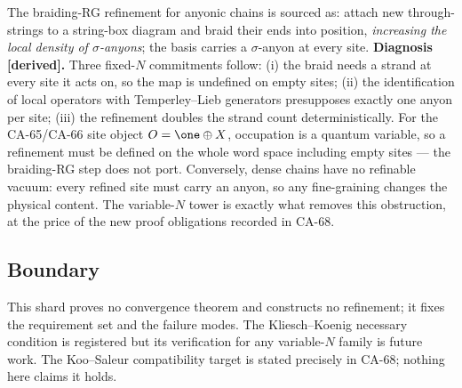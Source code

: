 The braiding-RG refinement for anyonic chains is sourced as: attach new
through-strings to a string-box diagram and braid their ends into position,
\emph{increasing the local density of \(\sigma\)-anyons}; the basis carries a
\(\sigma\)-anyon at every site.  \textbf{Diagnosis [derived].}  Three
fixed-\(N\) commitments follow: (i) the braid needs a strand at every site it
acts on, so the map is undefined on empty sites; (ii) the identification of
local operators with Temperley--Lieb generators presupposes exactly one anyon
per site; (iii) the refinement doubles the strand count deterministically.
For the CA-65/CA-66 site object \(O=\one\oplus X\), occupation is a quantum
variable, so a refinement must be defined on the whole word space including
empty sites --- the braiding-RG step does not port.  Conversely, dense chains
have no refinable vacuum: every refined site must carry an anyon, so any
fine-graining changes the physical content.  The variable-\(N\) tower is
exactly what removes this obstruction, at the price of the new proof
obligations recorded in CA-68.

\subsection{Boundary}

This shard proves no convergence theorem and constructs no refinement; it
fixes the requirement set and the failure modes.  The Kliesch--Koenig
necessary condition is registered but its verification for any variable-\(N\)
family is future work.  The Koo--Saleur compatibility target is stated
precisely in CA-68; nothing here claims it holds.
